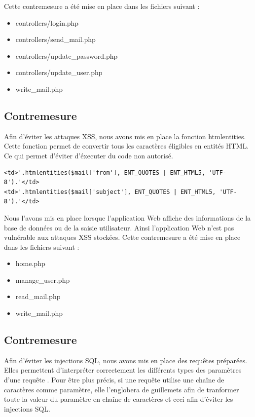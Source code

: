 \documentclass[12pt]{article}
\begin{document}
Cette contremesure a été mise en place dans les fichiers suivant :

\begin{itemize}
\item controllers/login.php
\item controllers/send\_mail.php
\item controllers/update\_password.php
\item controllers/update\_user.php
\item write\_mail.php
\end{itemize}

\subsection{Contremesure}\label{c2}

Afin d'éviter les attaques XSS, nous avons mis en place la fonction htmlentities. Cette fonction permet de convertir tous les caractères éligibles en entités HTML. Ce qui permet d'éviter d'éxecuter du code non autorisé.

\begin{lstlisting}[style=JAVA]
<td>'.htmlentities($mail['from'], ENT_QUOTES | ENT_HTML5, 'UTF-8').'</td>
<td>'.htmlentities($mail['subject'], ENT_QUOTES | ENT_HTML5, 'UTF-8').'</td>
\end{lstlisting}

Nous l'avons mis en place lorsque l'application Web affiche des informations de la base de données ou de la saisie utilisateur. Ainsi l'application Web n'est pas vulnérable aux attaques XSS stockées.
Cette contremesure a été mise en place dans les fichiers suivant :

\begin{itemize}
\item home.php
\item manage\_user.php
\item read\_mail.php
\item write\_mail.php
\end{itemize}

\subsection{Contremesure}\label{c3}

Afin d'éviter les injections SQL, nous avons mis en place des requêtes préparées. Elles permettent d'interpréter correctement les différents types des paramètres d'une requête . Pour être plus précis, si une requête utilise une chaîne de caractères comme paramètre, elle l'englobera de guillemets afin de tranformer toute la valeur du paramètre en chaîne de caractères et ceci afin d'éviter les injections SQL.
\end{document}
